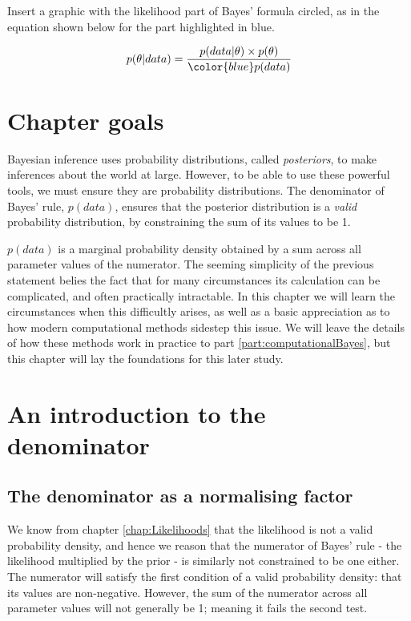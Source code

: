 \documentclass[11pt,fullpage]{book}
\begin{document}
Insert a graphic with the likelihood part of Bayes' formula circled, as in the equation shown below for the part highlighted in blue.

\begin{equation}
p(\theta|data) = \frac{p(data|\theta)\times p(\theta)}{{\color{blue}p(data)}}
\end{equation}\label{eq:Denominator_BayesHighlighted}


\section{Chapter goals}
Bayesian inference uses probability distributions, called \textit{posteriors}, to make inferences about the world at large. However, to be able to use these powerful tools, we must ensure they are probability distributions. The denominator of Bayes' rule, $p(data)$, ensures that the posterior distribution is a \textit{valid} probability distribution, by constraining the sum of its values to be 1. 

$p(data)$ is a marginal probability density obtained by a sum across all parameter values of the numerator. The seeming simplicity of the previous statement belies the fact that for many circumstances its calculation can be complicated, and often practically intractable. In this chapter we will learn the circumstances when this difficultly arises, as well as a basic appreciation as to how modern computational methods sidestep this issue. We will leave the details of how these methods work in practice to part \ref{part:computationalBayes}, but this chapter will lay the foundations for this later study.

\section{An introduction to the denominator}
\subsection{The denominator as a normalising factor}
We know from chapter \ref{chap:Likelihoods} that the likelihood is not a valid probability density, and hence we reason that the numerator of Bayes' rule - the likelihood multiplied by the prior - is similarly not constrained to be one either. The numerator will satisfy the first condition of a valid probability density: that its values are non-negative. However, the sum of the numerator across all parameter values will not generally be 1; meaning it fails the second test.
\end{document}
